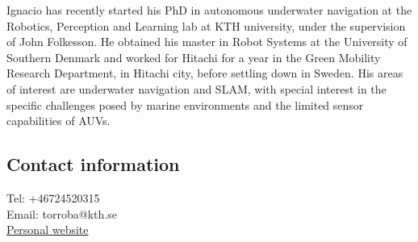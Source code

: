 \documentclass[
10pt, %
a4paper, %
oneside, %
BCOR5mm, %
]{scrartcl}
\begin{document}
Ignacio has recently started his PhD in autonomous underwater navigation at the Robotics, Perception and Learning lab at KTH university, under the supervision of John Folkesson.
He obtained his master in Robot Systems at the University of Southern Denmark and worked for Hitachi for a year in the Green Mobility Research Department, in Hitachi city, before settling down in Sweden.
His areas of interest are underwater navigation and SLAM, with special interest in the specific challenges posed by marine environments and the limited sensor capabilities of AUVs.

\subsection{Contact information}
Tel: +46724520315
\\
Email: torroba@kth.se
\\
\href{https://www.kth.se/profile/torroba}{Personal website}
\end{document}
